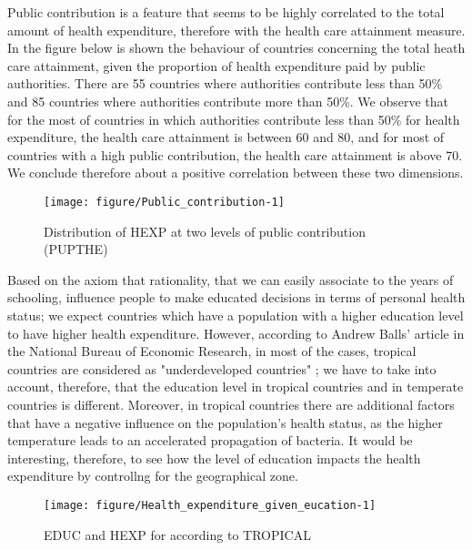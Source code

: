 \documentclass[12pt,a4paper]{article}\usepackage[]{graphicx}\usepackage[]{color}
\begin{document}
Public contribution is a feature that seems to be highly correlated to the total amount of health expenditure, therefore with the health care attainment measure. In the figure below is shown the behaviour of countries concerning the total heath care attainment, given the proportion of health expenditure paid by public authorities.  There are 55 countries where authorities contribute less than 50\% and 85 countries where authorities contribute more than 50\%. We observe that for the most of countries in which authorities contribute less than 50\% for health expenditure, the health care attainment is between 60 and 80, and for most of countries with a high public contribution, the health care attainment is above 70. We conclude therefore about a positive correlation between these two dimensions.
\begin{figure}[!htbp]

{\centering \texttt{[image: figure/Public\_contribution-1]} 

}

\caption[Distribution of HEXP at two levels of public contribution (PUPTHE)]{Distribution of HEXP at two levels of public contribution (PUPTHE)}\label{fig:Public contribution}
\end{figure}



Based on the axiom that  rationality, that we can easily associate to the years of schooling, influence people to make educated decisions in terms of personal health status; we expect countries which have a population with a higher education level to have higher health expenditure. However, according to Andrew Balls' article in the National Bureau of Economic Research, in most of the cases, tropical countries are considered as "underdeveloped countries" ; we have to take into account, therefore,  that the education level in tropical countries and in temperate  countries is different. Moreover, in tropical countries there are additional factors that have a negative influence on the population's health status, as the higher temperature leads to an accelerated propagation of bacteria.  It would be interesting, therefore, to see how the level of education impacts the health expenditure by controllng for the geographical zone.

\begin{figure}[!htbp]

{\centering \texttt{[image: figure/Health\_expenditure\_given\_eucation-1]} 

}

\caption[EDUC and HEXP for according to TROPICAL]{EDUC and HEXP for according to TROPICAL}\label{fig:Health expenditure given eucation}
\end{figure}
\end{document}
